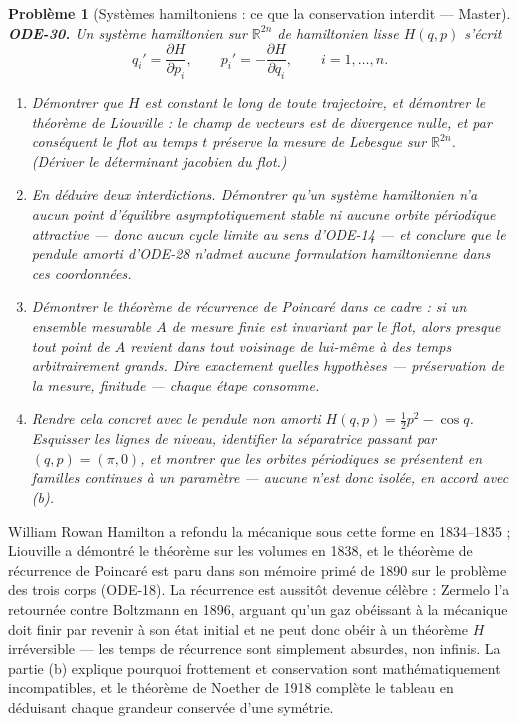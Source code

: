 \documentclass[11pt]{article}
\newtheorem{problem}{Problème}
\begin{document}
\bigskip

\begin{problem}[{Systèmes hamiltoniens : ce que la conservation interdit --- Master}]
\textbf{ODE-30.} Un système hamiltonien sur $ \mathbb{R}^{2n} $ de hamiltonien lisse
$ H(q,p) $ s'écrit
\[ q_i' = \frac{\partial H}{\partial p_i}, \qquad p_i' = -\frac{\partial H}{\partial q_i},
\qquad i = 1, \dots, n. \]
\begin{enumerate}
\item[(a)] Démontrer que $ H $ est constant le long de toute trajectoire, et démontrer le théorème de
Liouville : le champ de vecteurs est de divergence nulle, et par conséquent le flot au temps
$ t $ préserve la mesure de Lebesgue sur $ \mathbb{R}^{2n} $. (Dériver le déterminant
jacobien du flot.)
\item[(b)] En déduire deux interdictions. Démontrer qu'un système hamiltonien n'a aucun point
d'équilibre asymptotiquement stable ni aucune orbite périodique attractive --- donc aucun cycle
limite au sens d'ODE-14 --- et conclure que le pendule amorti d'ODE-28 n'admet aucune formulation
hamiltonienne dans ces coordonnées.
\item[(c)] Démontrer le théorème de récurrence de Poincaré dans ce cadre : si un ensemble mesurable
$ A $ de mesure finie est invariant par le flot, alors presque tout point de $ A $ revient
dans tout voisinage de lui-même à des temps arbitrairement grands. Dire exactement quelles
hypothèses --- préservation de la mesure, finitude --- chaque étape consomme.
\item[(d)] Rendre cela concret avec le pendule non amorti $ H(q,p) = \tfrac{1}{2}p^2 - \cos q $.
Esquisser les lignes de niveau, identifier la séparatrice passant par $ (q,p) = (\pi, 0) $, et
montrer que les orbites périodiques se présentent en familles continues à un paramètre --- aucune
n'est donc isolée, en accord avec (b).
\end{enumerate}

\end{problem}

\noindent William Rowan Hamilton a refondu la mécanique sous cette forme en 1834--1835 ;
Liouville a démontré le théorème sur les volumes en 1838, et le théorème de récurrence de Poincaré
est paru dans son mémoire primé de 1890 sur le problème des trois corps (ODE-18). La récurrence
est aussitôt devenue célèbre : Zermelo l'a retournée contre Boltzmann en 1896, arguant qu'un gaz
obéissant à la mécanique doit finir par revenir à son état initial et ne peut donc obéir à un
théorème $ H $ irréversible --- les temps de récurrence sont simplement absurdes, non infinis. La
partie (b) explique pourquoi frottement et conservation sont mathématiquement incompatibles, et le
théorème de Noether de 1918 complète le tableau en déduisant chaque grandeur conservée d'une
symétrie.
\end{document}
